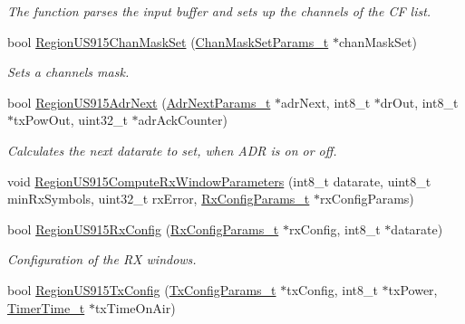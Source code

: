 \begin{DoxyCompactItemize}
\begin{DoxyCompactList}\small\item\em The function parses the input buffer and sets up the channels of the CF list. \end{DoxyCompactList}\item 
bool \mbox{\hyperlink{group___r_e_g_i_o_n_u_s915_ga9f5d2b3a3e5832ad822ac7f59abd3130}{Region\+U\+S915\+Chan\+Mask\+Set}} (\mbox{\hyperlink{group___r_e_g_i_o_n_ga6d24f7da136006410827dfb29f6b9b9e}{Chan\+Mask\+Set\+Params\+\_\+t}} $\ast$chan\+Mask\+Set)
\begin{DoxyCompactList}\small\item\em Sets a channels mask. \end{DoxyCompactList}\item 
bool \mbox{\hyperlink{group___r_e_g_i_o_n_u_s915_gaf76316af68c44cbbc44818e0a51cb4d6}{Region\+U\+S915\+Adr\+Next}} (\mbox{\hyperlink{group___r_e_g_i_o_n_ga567c2742622326b350b4e91bbf61b4ce}{Adr\+Next\+Params\+\_\+t}} $\ast$adr\+Next, int8\+\_\+t $\ast$dr\+Out, int8\+\_\+t $\ast$tx\+Pow\+Out, uint32\+\_\+t $\ast$adr\+Ack\+Counter)
\begin{DoxyCompactList}\small\item\em Calculates the next datarate to set, when A\+DR is on or off. \end{DoxyCompactList}\item 
void \mbox{\hyperlink{group___r_e_g_i_o_n_u_s915_gad480c9c758da7477276d2dc659db2f66}{Region\+U\+S915\+Compute\+Rx\+Window\+Parameters}} (int8\+\_\+t datarate, uint8\+\_\+t min\+Rx\+Symbols, uint32\+\_\+t rx\+Error, \mbox{\hyperlink{group___r_e_g_i_o_n_ga375c038078dfcfc7ef14280021db719e}{Rx\+Config\+Params\+\_\+t}} $\ast$rx\+Config\+Params)
\item 
bool \mbox{\hyperlink{group___r_e_g_i_o_n_u_s915_ga714ceef0507bb8bd0a65c5b2de8eff2c}{Region\+U\+S915\+Rx\+Config}} (\mbox{\hyperlink{group___r_e_g_i_o_n_ga375c038078dfcfc7ef14280021db719e}{Rx\+Config\+Params\+\_\+t}} $\ast$rx\+Config, int8\+\_\+t $\ast$datarate)
\begin{DoxyCompactList}\small\item\em Configuration of the RX windows. \end{DoxyCompactList}\item 
bool \mbox{\hyperlink{group___r_e_g_i_o_n_u_s915_ga6343e63ddd0e281369b5741319fecc58}{Region\+U\+S915\+Tx\+Config}} (\mbox{\hyperlink{group___r_e_g_i_o_n_gabed730d4d04b0b60d4b6d1966d3f21d3}{Tx\+Config\+Params\+\_\+t}} $\ast$tx\+Config, int8\+\_\+t $\ast$tx\+Power, \mbox{\hyperlink{utilities_8h_a4215ca43d3e953099ea758ce428599d0}{Timer\+Time\+\_\+t}} $\ast$tx\+Time\+On\+Air)

\end{DoxyCompactItemize}
